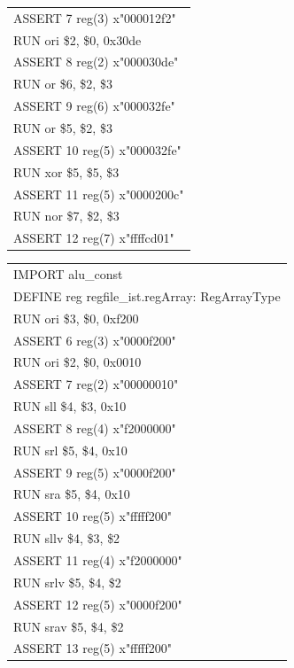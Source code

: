 \documentclass[11pt,utf8]{article}
\begin{document}
{{{\begin{center}
\begin{longtable}{p{15cm}}
		ASSERT{ }7{ }reg(3){ }x"000012f2"\\
		RUN{ }ori{ }\$2,{ }\$0,{ }0x30de\\
		ASSERT{ }8{ }reg(2){ }x"000030de"\\
		RUN{ }or{ }\$6,{ }\$2,{ }\$3\\
		ASSERT{ }9{ }reg(6){ }x"000032fe"\\
		RUN{ }or{ }\$5,{ }\$2,{ }\$3\\
		ASSERT{ }10{ }reg(5){ }x"000032fe"\\
		RUN{ }xor{ }\$5,{ }\$5,{ }\$3\\
		ASSERT{ }11{ }reg(5){ }x"0000200c"\\
		RUN{ }nor{ }\$7,{ }\$2,{ }\$3\\
		ASSERT{ }12{ }reg(7){ }x"ffffcd01"\\
		\hline \end{longtable} \end{center}
\begin{center}	\begin{longtable}{p{15cm}} \hline
		IMPORT{ }alu\_const\\
		DEFINE{ }reg{ }regfile\_ist.regArray:{ }RegArrayType\\
		RUN{ }ori{ }\$3,{ }\$0,{ }0xf200\\
		ASSERT{ }6{ }reg(3){ }x"0000f200"\\
		RUN{ }ori{ }\$2,{ }\$0,{ }0x0010\\
		ASSERT{ }7{ }reg(2){ }x"00000010"\\
		RUN{ }sll{ }\$4,{ }\$3,{ }0x10\\
		ASSERT{ }8{ }reg(4){ }x"f2000000"\\
		RUN{ }srl{ }\$5,{ }\$4,{ }0x10\\
		ASSERT{ }9{ }reg(5){ }x"0000f200"\\
		RUN{ }sra{ }\$5,{ }\$4,{ }0x10\\
		ASSERT{ }10{ }reg(5){ }x"fffff200"\\
		RUN{ }sllv{ }\$4,{ }\$3,{ }\$2\\
		ASSERT{ }11{ }reg(4){ }x"f2000000"\\
		RUN{ }srlv{ }\$5,{ }\$4,{ }\$2\\
		ASSERT{ }12{ }reg(5){ }x"0000f200"\\
		RUN{ }srav{ }\$5,{ }\$4,{ }\$2\\
		ASSERT{ }13{ }reg(5){ }x"fffff200"\\
		\hline \end{longtable} \end{center}

}}}
\end{document}
